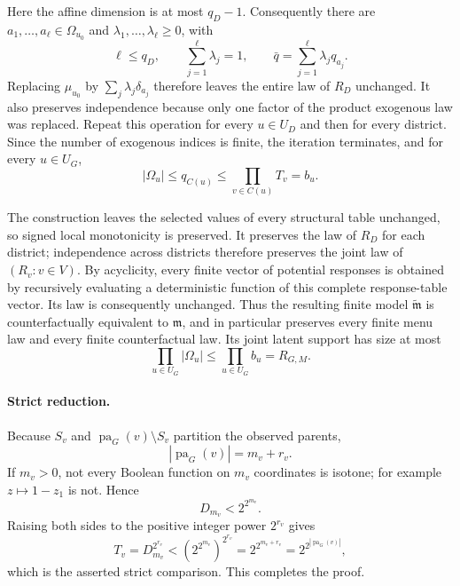Here the affine dimension is at most \(q_D-1\).  Consequently there are \(a_1,\ldots,a_\ell\in\Omega_{u_0}\) and \(\lambda_1,\ldots,\lambda_\ell\geq0\), with
\[
 \ell\leq q_D,
 \qquad
 \sum_{j=1}^{\ell}\lambda_j=1,
 \qquad
 \bar q=\sum_{j=1}^{\ell}\lambda_jq_{a_j}.
\]
Replacing \(\mu_{u_0}\) by \(\sum_j\lambda_j\delta_{a_j}\) therefore leaves the entire law of \(R_D\) unchanged.  It also preserves independence because only one factor of the product exogenous law was replaced.  Repeat this operation for every \(u\in U_D\) and then for every district.  Since the number of exogenous indices is finite, the iteration terminates, and for every \(u\in U_G\),
\[
 |\Omega_u|
 \leq q_{C(u)}
 \leq\prod_{v\in C(u)}T_v
 =b_u.
\]

The construction leaves the selected values of every structural table unchanged, so signed local monotonicity is preserved.  It preserves the law of \(R_D\) for each district; independence across districts therefore preserves the joint law of \((R_v:v\in V)\).  By acyclicity, every finite vector of potential responses is obtained by recursively evaluating a deterministic function of this complete response-table vector.  Its law is consequently unchanged.  Thus the resulting finite model \(\widetilde{\mathfrak m}\) is counterfactually equivalent to \(\mathfrak m\), and in particular preserves every finite menu law and every finite counterfactual law.  Its joint latent support has size at most
\[
 \prod_{u\in U_G}|\Omega_u|
 \leq\prod_{u\in U_G}b_u
 =R_{G,M}.
\]

\paragraph{Strict reduction.}
Because \(S_v\) and \(\operatorname{pa}_G(v)\setminus S_v\) partition the observed parents,
\[
 |\operatorname{pa}_G(v)|=m_v+r_v.
\]
If \(m_v>0\), not every Boolean function on \(m_v\) coordinates is isotone; for example \(z\mapsto1-z_1\) is not.  Hence
\[
 D_{m_v}<2^{2^{m_v}}.
\]
Raising both sides to the positive integer power \(2^{r_v}\) gives
\[
 T_v=D_{m_v}^{2^{r_v}}
 <\left(2^{2^{m_v}}\right)^{2^{r_v}}
 =2^{2^{m_v+r_v}}
 =2^{2^{|\operatorname{pa}_G(v)|}},
\]
which is the asserted strict comparison.  This completes the proof.